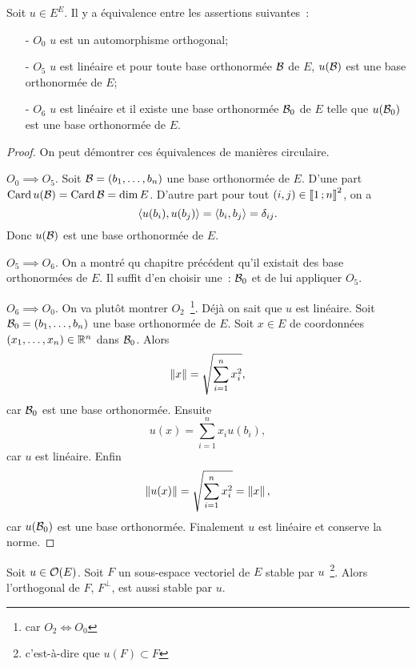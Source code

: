\begin{theo}
  Soit \(u \in E^E\). Il y a équivalence entre les assertions suivantes~:
  \begin{enumerate}
    \item[- \(O_0\)] \(u\) est un automorphisme orthogonal;
    \item[- \(O_5\)] \(u\) est linéaire et pour toute base orthonormée \(\mathcal{B}\) de \(E\), \(u(\mathcal{B})\) est une base orthonormée de \(E\);
    \item[- \(O_6\)] \(u\) est linéaire et il existe une base orthonormée \(\mathcal{B}_0\) de \(E\) telle que \(u(\mathcal{B}_0)\) est une base orthonormée de \(E\).
  \end{enumerate}
\end{theo}
\begin{proof}
  On peut démontrer ces équivalences de manières circulaire.

  \(O_0 \implies O_5\). Soit \(\mathcal{B}=(b_1, \dotsc, b_n)\) une base orthonormée de \(E\). D'une part \(\operatorname{Card} u(\mathcal{B})=\operatorname{Card} \mathcal{B}=\operatorname{dim} E\). D'autre part pour tout \((i,j) \in \mathopen{\llbracket}1\mathclose{}\mathpunct{};n\mathclose{\rrbracket}^2\), on a
  \begin{equation}
    \left\langle{u(b_i)},{u(b_j)}\right\rangle=\left\langle{b_i},{b_j}\right\rangle=\delta_{ij}.
  \end{equation}
  Donc \(u(\mathcal{B})\) est une base orthonormée de \(E\).

  \(O_5 \implies O_6\). On a montré qu chapitre précédent qu'il existait des base orthonormées de \(E\). Il suffit d'en choisir une~: \(\mathcal{B}_0\) et de lui appliquer \(O_5\).

  \(O_6 \implies O_0\). On va plutôt montrer \(O_2\)~\footnote{car \(O_2 \iff O_0\)}. Déjà on sait que \(u\) est linéaire. Soit \(\mathcal{B}_0 = (b_1, \dotsc, b_n)\) une base orthonormée de \(E\). Soit \(x \in E\) de coordonnées \((x_1, \dotsc, x_n) \in \mathbb{R}^n\) dans \(\mathcal{B}_0\). Alors
  \begin{equation}
    \left\lVert x\right\rVert = \sqrt{\sum_{i=1}^n x_i^2},
  \end{equation}
  car \(\mathcal{B}_0\) est une base orthonormée. Ensuite
  \begin{equation}
    u(x) = \sum_{i=1}^n x_i u(b_i),
  \end{equation}
  car \(u\) est linéaire. Enfin
  \begin{equation}
    \left\lVert u(x)\right\rVert = \sqrt{\sum_{i=1}^n x_i^2}=\left\lVert x\right\rVert,
  \end{equation}
  car \(u(\mathcal{B}_0)\) est une base orthonormée. Finalement \(u\) est linéaire et conserve la norme.
\end{proof}
\begin{prop}
  Soit \(u \in \mathcal{O}\!\left(E\right)\). Soit \(F\) un sous-espace vectoriel de \(E\) stable par \(u\)~\footnote{c'est-à-dire que \(u(F)\subset F\)}. Alors l'orthogonal de \(F\), \(F^\perp\), est aussi stable par \(u\).
\end{prop}
